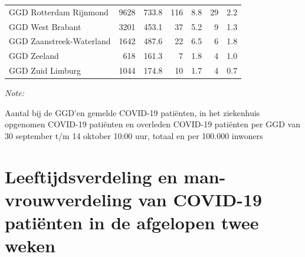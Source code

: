 \documentclass[
  english,
  man,floatsintext]{apa6}
\begin{document}
\begin{table}[H]
\begin{threeparttable}
\begin{tabular}{lrrrrrr}
GGD Rotterdam Rijnmond & 9628 & 733.8 & 116 & 8.8 & 29 & 2.2\\
GGD West Brabant & 3201 & 453.1 & 37 & 5.2 & 9 & 1.3\\
GGD Zaanstreek-Waterland & 1642 & 487.6 & 22 & 6.5 & 6 & 1.8\\
GGD Zeeland & 618 & 161.3 & 7 & 1.8 & 4 & 1.0\\
GGD Zuid Limburg & 1044 & 174.8 & 10 & 1.7 & 4 & 0.7\\
\bottomrule
\end{tabular}
\begin{tablenotes}
\item \textit{Note: } 
\item Aantal bij de GGD’en gemelde COVID-19 patiënten, in het ziekenhuis opgenomen COVID-19 patiënten en overleden COVID-19 patiënten per GGD van 30 september t/m 14 oktober 10:00 uur, totaal en per 100.000 inwoners
\end{tablenotes}
\end{threeparttable}
\endgroup{}
\end{table}

\newpage

\hypertarget{leeftijdsverdeling-en-man-vrouwverdeling-van-covid-19-patiuxebnten-in-de-afgelopen-twee-weken}{%
\section{Leeftijdsverdeling en man-vrouwverdeling van COVID-19 patiënten in de afgelopen twee weken}\label{leeftijdsverdeling-en-man-vrouwverdeling-van-covid-19-patiuxebnten-in-de-afgelopen-twee-weken}}
\end{document}
